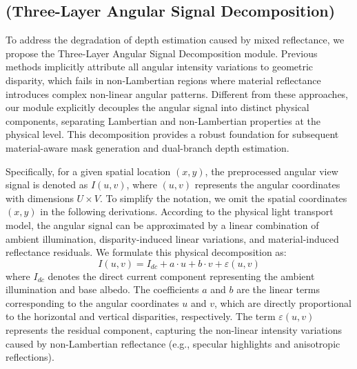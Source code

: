 \subsection{(Three-Layer Angular Signal Decomposition)}

To address the degradation of depth estimation caused by mixed reflectance, we propose the Three-Layer Angular Signal Decomposition module. Previous methods implicitly attribute all angular intensity variations to geometric disparity, which fails in non-Lambertian regions where material reflectance introduces complex non-linear angular patterns. Different from these approaches, our module explicitly decouples the angular signal into distinct physical components, separating Lambertian and non-Lambertian properties at the physical level. This decomposition provides a robust foundation for subsequent material-aware mask generation and dual-branch depth estimation.

Specifically, for a given spatial location $(x,y)$, the preprocessed angular view signal is denoted as $I(u,v)$, where $(u,v)$ represents the angular coordinates with dimensions $U \times V$. To simplify the notation, we omit the spatial coordinates $(x,y)$ in the following derivations. According to the physical light transport model, the angular signal can be approximated by a linear combination of ambient illumination, disparity-induced linear variations, and material-induced reflectance residuals. We formulate this physical decomposition as:
\begin{equation}
\label{eq:eq1}
I(u,v) = I_{dc} + a \cdot u + b \cdot v + \varepsilon(u,v)
\end{equation}
where $I_{dc}$ denotes the direct current component representing the ambient illumination and base albedo. The coefficients $a$ and $b$ are the linear terms corresponding to the angular coordinates $u$ and $v$, which are directly proportional to the horizontal and vertical disparities, respectively. The term $\varepsilon(u,v)$ represents the residual component, capturing the non-linear intensity variations caused by non-Lambertian reflectance (e.g., specular highlights and anisotropic reflections).

